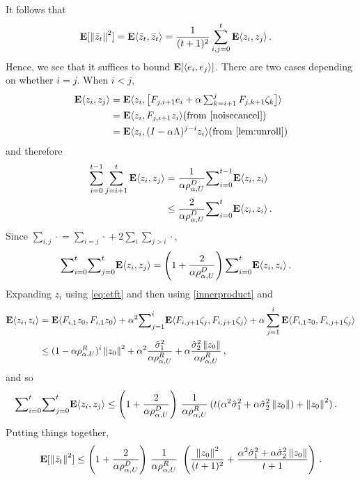 It follows that 
\begin{align*}
\mathbf{E}[\left\| \bar{z}_t\right\|^2]&=\mathbf{E}\langle\bar{z}_t,\bar{z}_t\rangle
=\frac{1}{(t+1)^2} \sum_{i,j=0}^t \mathbf{E}\langle z_i,z_j\rangle\,.
\end{align*}
Hence, we see that it suffices to bound $\mathbf{E}[\langle e_i,  e_j \rangle]$.
There are two cases depending on whether $i=j$. When $i< j$,
\begin{align*}
\E\ip{z_i,z_j}
&=\E \ip{z_i,\big[F_{j,i+1} e_i+\alpha\textstyle\sum_{k=i+1}^j F_{j,k+1}\zeta_{k}\big]}\\
&=\E\ip{z_i,F_{j,i+1} z_i}  \text{(from \cref{noisecancel})}\\
&=\E\ip{z_i, (I-\alpha \Lambda)^{j-i} z_i} \text{(from \cref{lem:unroll})}
\end{align*}
and therefore
\begin{align*}
\label{inter}
\sum_{i=0}^{t-1}\sum_{j=i+1}^t \mathbf{E}\langle z_i,z_j\rangle
&=\frac1{\alpha\rho^D_{\alpha,U}} {\sum}_{i=0}^{t-1}\mathbf{E}\langle z_i,z_i\rangle\\
&\leq \frac2{\alpha\rho^D_{\alpha,U}}{\sum}_{i=0}^{t}\mathbf{E}\langle z_i,z_i\rangle\,.
\end{align*}
Since $\sum_{i,j}\cdot{} = \sum_{i=j}\cdot{} + 2 \sum_i \sum_{j>i} \cdot{}$,
\begin{align*}
{\sum}_{i=0}^{t}{\sum}_{j=0}^{t} \mathbf{E}\langle z_i,z_j\rangle&= \left(1+\frac2{\alpha\rho^D_{\alpha,U}}\right){\sum}_{i=0}^{t}\mathbf{E}\langle z_i,z_i\rangle\,.
\end{align*}
Expanding $z_i$ using \eqref{eq:etft} and then using \cref{innerproduct} and 
\begin{align*}
\mathbf{E}\langle z_i,z_i\rangle&=\mathbf{E}\langle F_{i,1}z_0,F_{i,1}z_0\rangle+\alpha^2{\sum}_{j=1}^i\mathbf{E}\langle F_{i,j+1}\zeta_j, F_{i,j+1}\zeta_j\rangle+\alpha\sum_{j=1}^i  \mathbf{E}\langle F_{i,1} z_0, F_{i,j+1}\zeta_j\rangle\\
&\leq (1-\alpha\rho^R_{\alpha,U})^i\left\| z_0\right\|^2+ \alpha^2\frac{\hat{\sigma}_1^2}{\alpha \rho^R_{\alpha,U}}+ \alpha \frac{\hat{\sigma}^2_2 \left\| z_0\right\|}{\alpha\rho^R_{\alpha,U}}\,,
\end{align*}
and so
\begin{align*}
{\sum}_{i=0}^{t}{\sum}_{j=0}^{t} \mathbf{E}\langle z_i,z_j\rangle
&\leq \left(1+\frac2{\alpha\rho^D_{\alpha,U} }\right)\, \frac1{\alpha\rho^R_{\alpha,U}}\, (t(\alpha^2\hat{\sigma}_1^2+\alpha \hat{\sigma}^2_2\left\| z_0\right\|) +\left\| z_0\right\|^2)\,.
\end{align*}
Putting things together,
\begin{align}
\mathbf{E}[\left\| \bar{z}_t\right\|^2]
\leq \left(1+\frac2{\alpha\rho^D_{\alpha,U}}\right)\, \frac1{\alpha\rho^R_{\alpha,U}}\, \,
\left(\frac{\left\| z_0\right\|^2}{(t+1)^2}+ \frac{\alpha^2\hat{\sigma}_1^2+\alpha \hat{\sigma}^2_2\left\| z_0\right\|}{t+1} \right)\,.
\end{align}



